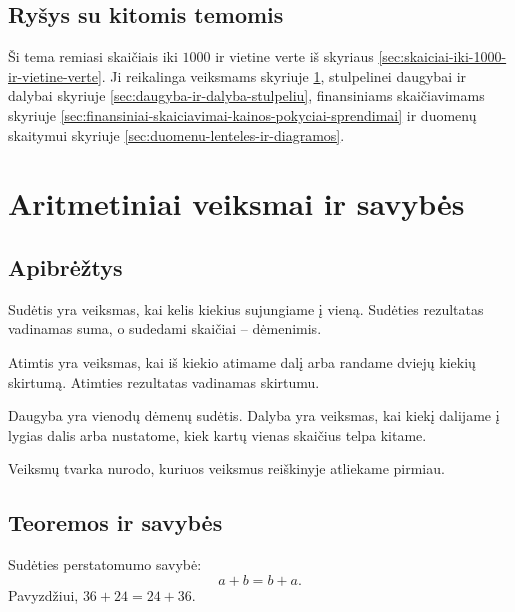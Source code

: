 \subsection{Ryšys su kitomis temomis}

Ši tema remiasi skaičiais iki \(1000\) ir vietine verte iš skyriaus \ref{sec:skaiciai-iki-1000-ir-vietine-verte}. Ji reikalinga veiksmams skyriuje \ref{sec:aritmetiniai-veiksmai-ir-savybes}, stulpelinei daugybai ir dalybai skyriuje \ref{sec:daugyba-ir-dalyba-stulpeliu}, finansiniams skaičiavimams skyriuje \ref{sec:finansiniai-skaiciavimai-kainos-pokyciai-sprendimai} ir duomenų skaitymui skyriuje \ref{sec:duomenu-lenteles-ir-diagramos}.

\section{Aritmetiniai veiksmai ir savybės}\label{sec:aritmetiniai-veiksmai-ir-savybes}

\subsection{Apibrėžtys}

\begin{apibreztis}
Sudėtis yra veiksmas, kai kelis kiekius sujungiame į vieną. Sudėties rezultatas vadinamas suma, o sudedami skaičiai -- dėmenimis.
\end{apibreztis}

\begin{apibreztis}
Atimtis yra veiksmas, kai iš kiekio atimame dalį arba randame dviejų kiekių skirtumą. Atimties rezultatas vadinamas skirtumu.
\end{apibreztis}

\begin{apibreztis}
Daugyba yra vienodų dėmenų sudėtis. Dalyba yra veiksmas, kai kiekį dalijame į lygias dalis arba nustatome, kiek kartų vienas skaičius telpa kitame.
\end{apibreztis}

\begin{apibreztis}
Veiksmų tvarka nurodo, kuriuos veiksmus reiškinyje atliekame pirmiau.
\end{apibreztis}

\subsection{Teoremos ir savybės}

\begin{savybe}
Sudėties perstatomumo savybė:
\[
a+b=b+a.
\]
Pavyzdžiui, \(36+24=24+36\).
\end{savybe}

